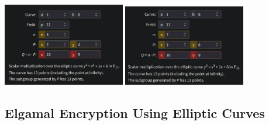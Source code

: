 {\begin{center}
        \includegraphics[width=0.4\textwidth]{images/finding_shared_key.png} \hfill
        \includegraphics[width=0.4\textwidth]{images/finding_shared_key_2.png} \\
\end{center}
}


\newpage
\subsection{Elgamal Encryption Using Elliptic Curves}

